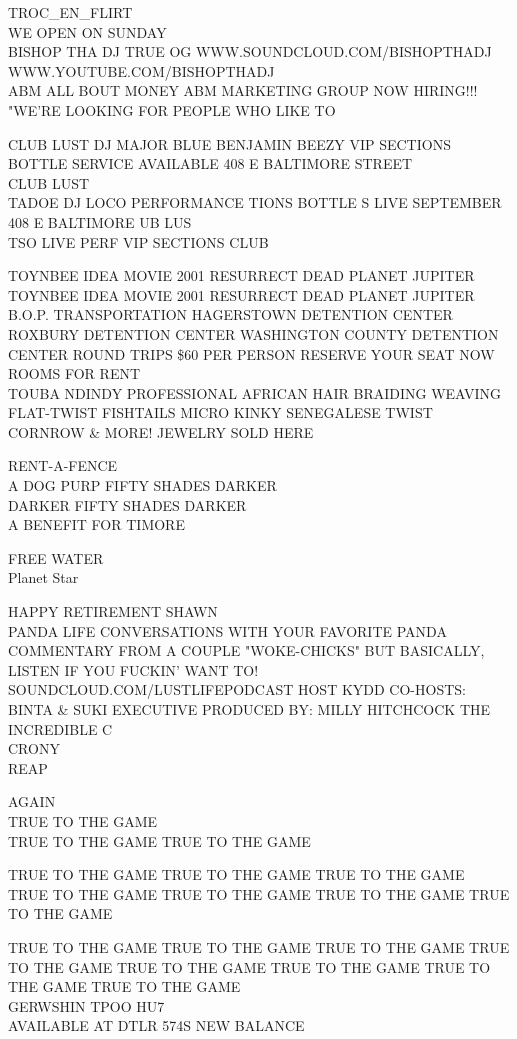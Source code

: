 \documentclass[10pt,letterpaper]{article}
\begin{document}
TROC\_EN\_FLIRT\\
WE OPEN ON SUNDAY\\
BISHOP THA DJ TRUE OG WWW.SOUNDCLOUD.COM/BISHOPTHADJ WWW.YOUTUBE.COM/BISHOPTHADJ\\
ABM ALL BOUT MONEY ABM MARKETING GROUP NOW HIRING!!! "WE'RE LOOKING FOR PEOPLE WHO LIKE TO

CLUB LUST DJ MAJOR BLUE BENJAMIN BEEZY VIP SECTIONS BOTTLE SERVICE AVAILABLE 408 E BALTIMORE STREET\\
CLUB LUST\\
TADOE DJ LOCO PERFORMANCE TIONS BOTTLE S LIVE SEPTEMBER 408 E BALTIMORE UB LUS\\
TSO LIVE PERF VIP SECTIONS CLUB

TOYNBEE IDEA MOVIE 2001 RESURRECT DEAD PLANET JUPITER TOYNBEE IDEA MOVIE 2001 RESURRECT DEAD PLANET JUPITER\\
B.O.P. TRANSPORTATION HAGERSTOWN DETENTION CENTER ROXBURY DETENTION CENTER WASHINGTON COUNTY DETENTION CENTER ROUND TRIPS \$60 PER PERSON RESERVE YOUR SEAT NOW\\
ROOMS FOR RENT\\
TOUBA NDINDY PROFESSIONAL AFRICAN HAIR BRAIDING WEAVING FLAT{-}TWIST FISHTAILS MICRO KINKY SENEGALESE TWIST CORNROW \& MORE!  JEWELRY SOLD HERE

RENT{-}A{-}FENCE\\
A DOG PURP FIFTY SHADES DARKER\\
DARKER FIFTY SHADES DARKER\\
A BENEFIT FOR TIMORE

FREE WATER\\
Planet Star

HAPPY RETIREMENT SHAWN\\
PANDA LIFE CONVERSATIONS WITH YOUR FAVORITE PANDA COMMENTARY FROM A COUPLE "WOKE{-}CHICKS" BUT BASICALLY, LISTEN IF YOU FUCKIN' WANT TO!  SOUNDCLOUD.COM/LUSTLIFEPODCAST HOST KYDD CO{-}HOSTS: BINTA \& SUKI EXECUTIVE PRODUCED BY: MILLY HITCHCOCK THE INCREDIBLE C\\
CRONY\\
REAP

AGAIN\\
TRUE TO THE GAME\\
TRUE TO THE GAME TRUE TO THE GAME

TRUE TO THE GAME TRUE TO THE GAME TRUE TO THE GAME\\
TRUE TO THE GAME TRUE TO THE GAME TRUE TO THE GAME TRUE TO THE GAME

TRUE TO THE GAME TRUE TO THE GAME TRUE TO THE GAME TRUE TO THE GAME TRUE TO THE GAME TRUE TO THE GAME TRUE TO THE GAME TRUE TO THE GAME\\
GERWSHIN TPOO HU7\\
AVAILABLE AT DTLR 574S NEW BALANCE
\end{document}

